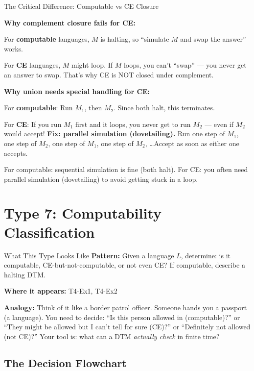 \documentclass[11pt,a4paper]{article}
\newcommand{\keytakeaway}[1]{%
  \par\vspace{0.3em}%
  \colorbox{yellow!60}{\parbox{\dimexpr\linewidth-2\fboxsep}{#1}}%
  \vspace{0.3em}}
\begin{document}
\begin{conceptbox}{The Critical Difference: Computable vs CE Closure}

\textbf{Why complement closure fails for CE:}

For \textbf{computable} languages, $M$ is halting, so ``simulate $M$ and swap the answer'' works.

For \textbf{CE} languages, $M$ might loop. If $M$ loops, you can't ``swap'' --- you never get an answer to swap. That's why CE is NOT closed under complement.

\textbf{Why union needs special handling for CE:}

For \textbf{computable}: Run $M_1$, then $M_2$. Since both halt, this terminates.

For \textbf{CE}: If you run $M_1$ first and it loops, you never get to run $M_2$ --- even if $M_2$ would accept! \textbf{Fix: parallel simulation (dovetailing).} Run one step of $M_1$, one step of $M_2$, one step of $M_1$, one step of $M_2$, \ldots Accept as soon as either one accepts.

\keytakeaway{For computable: sequential simulation is fine (both halt). For CE: you often need parallel simulation (dovetailing) to avoid getting stuck in a loop.}
\end{conceptbox}

\newpage
\section{Type 7: Computability Classification}

\begin{notebox}{What This Type Looks Like}
\textbf{Pattern:} Given a language $L$, determine: is it computable, CE-but-not-computable, or not even CE? If computable, describe a halting DTM.

\textbf{Where it appears:} T4-Ex1, T4-Ex2

\textbf{Analogy:} Think of it like a border patrol officer. Someone hands you a passport (a language). You need to decide: ``Is this person allowed in (computable)?'' or ``They might be allowed but I can't tell for sure (CE)?'' or ``Definitely not allowed (not CE)?'' Your tool is: what can a DTM \emph{actually check} in finite time?
\end{notebox}

\subsection{The Decision Flowchart}
\end{document}
